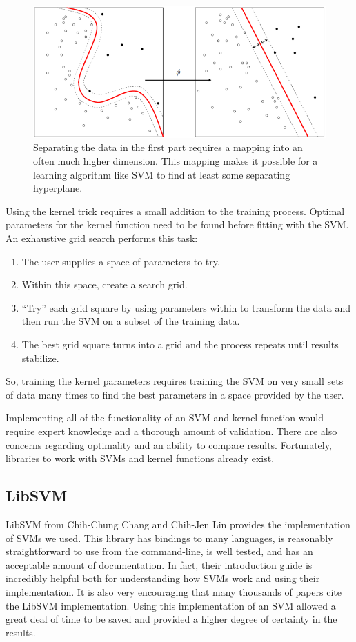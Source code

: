 \documentclass[11pt]{article} %
\begin{document}
\begin{figure}[h]
  \centering
  \includegraphics[scale=.6]{images/kernel-machine.png}
  \caption{Separating the data in the first part requires a mapping into an
      often much higher dimension. This mapping makes it possible for a learning 
      algorithm like SVM to find at least some separating hyperplane.}
  \label{fig:kernel-machine}
\end{figure}

Using the kernel trick requires a small addition to the training process. Optimal
parameters for the kernel function need to be found before fitting with the SVM.
An exhaustive grid search performs this task:
\begin{enumerate}
    \item The user supplies a space of parameters to try.
    \item Within this space, create a search grid.
    \item ``Try'' each grid square by using parameters within to transform
        the data and then run the SVM on a subset of the training data.
    \item The best grid square turns into a grid and the process repeats 
        until results stabilize.
\end{enumerate}

So, training the kernel parameters requires training the SVM on very small sets
of data many times to find the best parameters in a space provided by the user.

Implementing all of the functionality of an SVM and kernel function would require
expert knowledge and a thorough amount of validation. There are also concerns 
regarding optimality and an ability to compare results. Fortunately, libraries to 
work with SVMs and kernel functions already exist.

\subsection{LibSVM}
\label{sec:libsvm}
LibSVM \cite{chang2011libsvm} from Chih-Chung Chang and Chih-Jen Lin provides the
implementation of SVMs we used.  This library has bindings to many languages, is 
reasonably straightforward to use from the command-line, is well tested, and has an 
acceptable amount of documentation. In fact, their introduction guide 
\cite{chang2011libsvm} is incredibly helpful both for understanding how SVMs work
and using their implementation. It is also very encouraging that many thousands of
papers cite the LibSVM implementation.  Using this implementation of an 
SVM allowed a great deal of time to be saved and provided a higher degree of 
certainty in the results.
\end{document}
